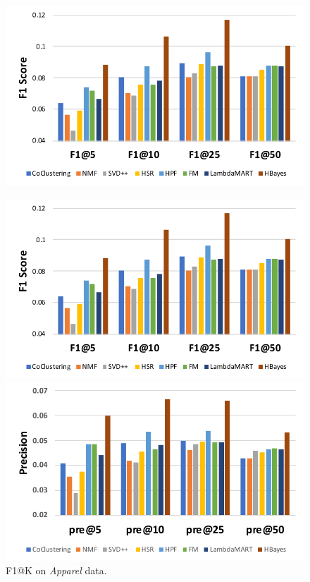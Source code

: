 {\begin{figure}[!htb]
\includegraphics[width=0.7\linewidth]{fig/legend}
\end{figure}

\begin{figure}[!htb]
  \includegraphics[width=\linewidth]{fig/F1-score_jd}
  \caption{F1@K on \emph{Apparel} data.}
  \label{fig:perf_cmp_F1_apparel}
\endminipage\hfill
{}
  \includegraphics[width=\linewidth]{fig/precision_jd}

\end{figure}}

